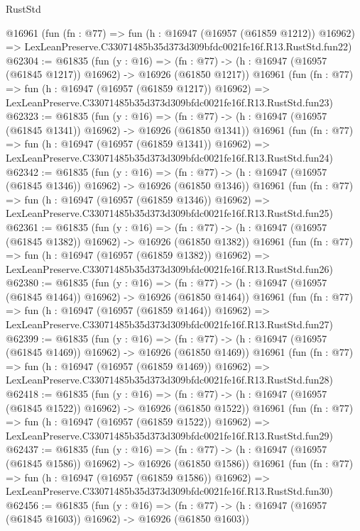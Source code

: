 \begin{lexlean}{RustStd}
\begin{coremodule}
    @16961
    (fun (fn : @77) =>
    fun (h : @16947 (@16957 (@61859 @1212)) @16962) =>
    LexLeanPreserve.C33071485b35d373d309bfdc0021fe16f.R13.RustStd.fun22)
@62304 := @61835
    (fun (y : @16) =>
    (fn : @77) -> (h : @16947 (@16957 (@61845 @1217)) @16962) -> @16926 (@61850 @1217))
    @16961
    (fun (fn : @77) =>
    fun (h : @16947 (@16957 (@61859 @1217)) @16962) =>
    LexLeanPreserve.C33071485b35d373d309bfdc0021fe16f.R13.RustStd.fun23)
@62323 := @61835
    (fun (y : @16) =>
    (fn : @77) -> (h : @16947 (@16957 (@61845 @1341)) @16962) -> @16926 (@61850 @1341))
    @16961
    (fun (fn : @77) =>
    fun (h : @16947 (@16957 (@61859 @1341)) @16962) =>
    LexLeanPreserve.C33071485b35d373d309bfdc0021fe16f.R13.RustStd.fun24)
@62342 := @61835
    (fun (y : @16) =>
    (fn : @77) -> (h : @16947 (@16957 (@61845 @1346)) @16962) -> @16926 (@61850 @1346))
    @16961
    (fun (fn : @77) =>
    fun (h : @16947 (@16957 (@61859 @1346)) @16962) =>
    LexLeanPreserve.C33071485b35d373d309bfdc0021fe16f.R13.RustStd.fun25)
@62361 := @61835
    (fun (y : @16) =>
    (fn : @77) -> (h : @16947 (@16957 (@61845 @1382)) @16962) -> @16926 (@61850 @1382))
    @16961
    (fun (fn : @77) =>
    fun (h : @16947 (@16957 (@61859 @1382)) @16962) =>
    LexLeanPreserve.C33071485b35d373d309bfdc0021fe16f.R13.RustStd.fun26)
@62380 := @61835
    (fun (y : @16) =>
    (fn : @77) -> (h : @16947 (@16957 (@61845 @1464)) @16962) -> @16926 (@61850 @1464))
    @16961
    (fun (fn : @77) =>
    fun (h : @16947 (@16957 (@61859 @1464)) @16962) =>
    LexLeanPreserve.C33071485b35d373d309bfdc0021fe16f.R13.RustStd.fun27)
@62399 := @61835
    (fun (y : @16) =>
    (fn : @77) -> (h : @16947 (@16957 (@61845 @1469)) @16962) -> @16926 (@61850 @1469))
    @16961
    (fun (fn : @77) =>
    fun (h : @16947 (@16957 (@61859 @1469)) @16962) =>
    LexLeanPreserve.C33071485b35d373d309bfdc0021fe16f.R13.RustStd.fun28)
@62418 := @61835
    (fun (y : @16) =>
    (fn : @77) -> (h : @16947 (@16957 (@61845 @1522)) @16962) -> @16926 (@61850 @1522))
    @16961
    (fun (fn : @77) =>
    fun (h : @16947 (@16957 (@61859 @1522)) @16962) =>
    LexLeanPreserve.C33071485b35d373d309bfdc0021fe16f.R13.RustStd.fun29)
@62437 := @61835
    (fun (y : @16) =>
    (fn : @77) -> (h : @16947 (@16957 (@61845 @1586)) @16962) -> @16926 (@61850 @1586))
    @16961
    (fun (fn : @77) =>
    fun (h : @16947 (@16957 (@61859 @1586)) @16962) =>
    LexLeanPreserve.C33071485b35d373d309bfdc0021fe16f.R13.RustStd.fun30)
@62456 := @61835
    (fun (y : @16) =>
    (fn : @77) -> (h : @16947 (@16957 (@61845 @1603)) @16962) -> @16926 (@61850 @1603))

\end{coremodule}
\end{lexlean}

